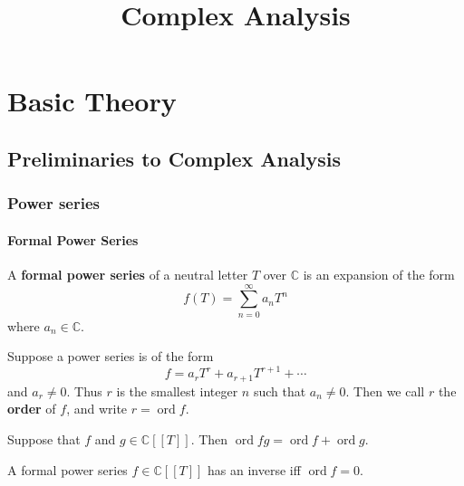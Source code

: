 \documentclass[12pt, oneside]{book}
\begin{document}
\frontmatter
\title{{\Huge{\textbf{Complex Analysis}}}}
\maketitle
{}
\tableofcontents %


\mainmatter
{} %







\part{Basic Theory}
\chapter{Preliminaries to Complex Analysis}
\section{Power series}
\subsection{Formal Power Series}
\begin{definition}
    A \textbf{formal power series} of a neutral letter $T$ over $\mathbb{C}$ is an expansion of the form
    \begin{equation*}
        f(T)=\sum_{n=0}^{\infty}a_n T^n
    \end{equation*}
    where $a_n\in\mathbb{C}$.
\end{definition}
\begin{definition}
    Suppose a power series is of the form
    \begin{equation*}
        f=a_r T^r+a_{r+1} T^{r+1}+\cdots
    \end{equation*}
    and $a_r \neq 0$. Thus $r$ is the smallest integer $n$ such that $a_n \neq 0$. Then we call $r$ the \textbf{order} of $f$, and write $r=\operatorname{ord} f$.
\end{definition}

\begin{proposition}
    Suppose that $f$ and $g\in \mathbb{C}[[T]]$.
    Then
    $\operatorname{ord}f g=\operatorname{ord} f+\operatorname{ord} g$.
\end{proposition}
\begin{corollary}
    A formal power series $f\in \mathbb{C}[[T]]$ has an inverse iff $\operatorname{ord} f=0$.
\end{corollary}
\end{document}
